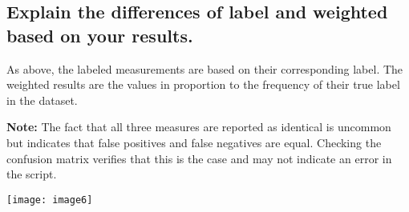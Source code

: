 \documentclass[]{article}
\begin{document}
\subsection*{Explain the differences of label and weighted based on your results.}

As above, the labeled measurements are based on their corresponding label. The weighted results are the values in proportion to the frequency of their true label in the dataset.

\textbf{Note:} The fact that all three measures are reported as identical is uncommon but indicates that false positives and false negatives are equal. Checking the confusion matrix verifies that this is the case and may not indicate an error in the script.

\texttt{[image: image6]}
\end{document}
